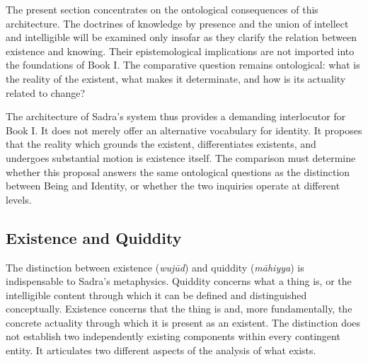\label{para:VS.B01.P01.C08.S17.SS03.P004}

The present section concentrates on the
ontological consequences of this architecture.
The doctrines of knowledge by presence
and the union of intellect and intelligible
will be examined only insofar as they
clarify the relation between existence
and knowing. Their epistemological
implications are not imported into the
foundations of Book I. The comparative
question remains ontological: what is
the reality of the existent, what makes
it determinate, and how is its actuality
related to change?

\label{para:VS.B01.P01.C08.S17.SS03.P005}

The architecture of Sadra's system thus
provides a demanding interlocutor for
Book I. It does not merely offer an
alternative vocabulary for identity.
It proposes that the reality which
grounds the existent, differentiates
existents, and undergoes substantial
motion is existence itself. The
comparison must determine whether
this proposal answers the same
ontological questions as the distinction
between Being and Identity, or whether
the two inquiries operate at different
levels.




\subsection{Existence and Quiddity}
\label{subsec:ch08_s17_ss04}

\label{para:VS.B01.P01.C08.S17.SS04.P001}

The distinction between existence
(\textit{wujūd}) and quiddity
(\textit{māhiyya}) is indispensable
to Sadra's metaphysics. Quiddity concerns
what a thing is, or the intelligible
content through which it can be defined
and distinguished conceptually. Existence
concerns that the thing is and, more
fundamentally, the concrete actuality
through which it is present as an existent.
The distinction does not establish two
independently existing components
within every contingent entity. It
articulates two different aspects of
the analysis of what exists.

